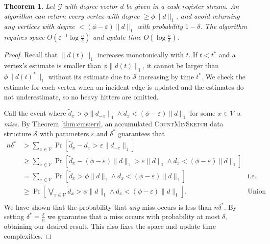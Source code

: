\documentclass{report}
\newtheorem{theorem}{Theorem}[section]
\newcommand{\algoname}[1]{\textnormal{\textsc{#1}}}
\begin{document}
\begin{theorem} \label{thm:dchh:cashregister}
Let $\mathcal{G}$ with degree vector $d$ be given in a cash register stream.
An algorithm can return every vertex with degree $\geq \phi \|d\|_1$, and avoid returning any vertices with degree $< (\phi - \varepsilon)\|d\|_1$ with probability $1-\delta$.
The algorithm requires space $O \left ( \varepsilon^{-1}\log \frac{n}{\delta} \right )$ and update time $O \left ( \log \frac{n}{\delta} \right )$.
\end{theorem}

\begin{proof}
Recall that $\|d(t)\|_1$ increases monotonically with $t$. 
If $t < t^*$ and a vertex's estimate is smaller than $\phi \|d(t)\|_1$, it cannot be larger than $\phi \|d(t)^*\|_1$ without its estimate due to $\mathcal{S}$ increasing by time $t^*$.
We check the estimate for each vertex when an incident edge is updated and the estimates do not underestimate, so no heavy hitters are omitted.

Call the event where $\widetilde{d}_x > \phi \|d_{-x}\|_1 \wedge d_x < (\phi - \varepsilon) \|d\|_1$ for some $x \in \mathcal{V}$ a \emph{miss}.
By Theorem \ref{thm:cms:err}, an accumulated \algoname{CountMinSketch} data structure $\mathcal{S}$ with parameters $\varepsilon$ and $\delta^*$ guarantees that 
%
\begin{align*}
n\delta^* 
&>
\sum_{x \in \mathcal{V}} \Pr \left [ \widetilde{d}_x - d_x > \varepsilon \|d_{-x}\|_1 \right ] 
& \\
&\geq
\sum_{x \in \mathcal{V}} \Pr \left [ \widetilde{d}_x - (\phi - \varepsilon)\|d\|_1 > \varepsilon \|d\|_1 \wedge d_x < (\phi - \varepsilon) \|d\|_1 \right ] 
& \\
&=
\sum_{x \in \mathcal{V}} \Pr \left [ \widetilde{d}_x > \phi \|d\|_1 \wedge d_x < (\phi - \varepsilon) \|d\|_1 \right ] 
& \text{i.e. sum of misses}  \\
&\geq
\Pr \left [ \bigvee_{x \in \mathcal{V}} \widetilde{d}_x > \phi \|d\|_1 \wedge d_x < (\phi - \varepsilon) \|d\|_1 \right ].
& \text{Union bound} \\
\end{align*}
We have shown that the probability that \emph{any} miss occurs is less than $n\delta^*$.
By setting $\delta^* = \frac{\delta}{n}$ we guarantee that a miss occurs with probability at most $\delta$, obtaining our desired result.
This also fixes the space and update time complexities.
\end{proof}
\end{document}
